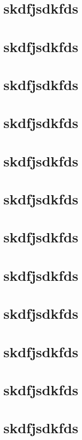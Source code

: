 \chapter{skdfjsdkfds}
\chapter{skdfjsdkfds}
\chapter{skdfjsdkfds}
\chapter{skdfjsdkfds}
\chapter{skdfjsdkfds}
\chapter{skdfjsdkfds}
\chapter{skdfjsdkfds}
\chapter{skdfjsdkfds}
\chapter{skdfjsdkfds}
\chapter{skdfjsdkfds}
\chapter{skdfjsdkfds}
\chapter{skdfjsdkfds}